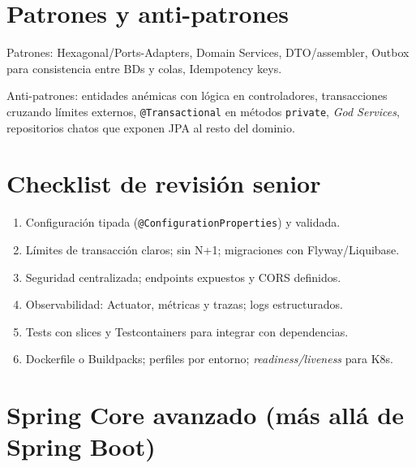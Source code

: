 \documentclass[11pt,a4paper]{article}
\begin{document}
\section{Patrones y anti-patrones}
\begin{refbox}
Patrones: Hexagonal/Ports-Adapters, Domain Services, DTO/assembler, Outbox para consistencia entre BDs y colas, Idempotency keys.
\end{refbox}

\begin{warnbox}
Anti-patrones: entidades anémicas con lógica en controladores, transacciones cruzando límites externos, \texttt{@Transactional} en métodos \texttt{private}, \emph{God Services}, repositorios chatos que exponen JPA al resto del dominio.
\end{warnbox}

\section{Checklist de revisión senior}
\begin{enumerate}[leftmargin=*]
  \item Configuración tipada (\texttt{@ConfigurationProperties}) y validada.
  \item Límites de transacción claros; sin N+1; migraciones con Flyway/Liquibase.
  \item Seguridad centralizada; endpoints expuestos y CORS definidos.
  \item Observabilidad: Actuator, métricas y trazas; logs estructurados.
  \item Tests con slices y Testcontainers para integrar con dependencias.
  \item Dockerfile o Buildpacks; perfiles por entorno; \emph{readiness/liveness} para K8s.
\end{enumerate}

\section{Spring Core avanzado (más allá de Spring Boot)}
\end{document}

